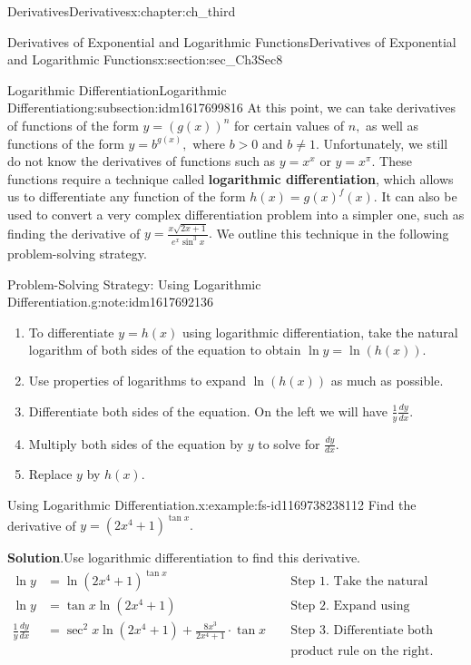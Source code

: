 \documentclass[oneside,10pt,]{book}
\newcommand{\blocktitlefont}{\relax}
\newcommand{\terminology}[1]{\textbf{#1}}
\numberwithin{equation}{section}
\newcommand{\gt}{>}
\newcommand{\amp}{&}
\begin{document}
\begin{chapterptx}{Derivatives}{}{Derivatives}{}{}{x:chapter:ch_third}
\begin{sectionptx}{Derivatives of Exponential and Logarithmic Functions}{}{Derivatives of Exponential and Logarithmic Functions}{}{}{x:section:sec_Ch3Sec8}
\begin{subsectionptx}{Logarithmic Differentiation}{}{Logarithmic Differentiation}{}{}{g:subsection:idm1617699816}
At this point, we can take derivatives of functions of the form \(y=(g(x))^n\) for certain values of \(n,\) as well as functions of the form \(y=b^{g(x)},\) where \(b\gt 0\) and \(b\neq 1.\) Unfortunately, we still do not know the derivatives of functions such as \(y=x^x\) or \(y=x^\pi.\) These functions require a technique called \terminology{logarithmic differentiation}, which allows us to differentiate any function of the form \(h(x)=g(x)^f(x).\) It can also be used to convert a very complex differentiation problem into a simpler one, such as finding the derivative of \(y=\frac{x\sqrt{2x+1}}{e^x\sin^3x}.\) We outline this technique in the following problem-solving strategy.%
\begin{note}{Problem-Solving Strategy: Using Logarithmic Differentiation.}{g:note:idm1617692136}%
%
\begin{enumerate}
\item{}To differentiate \(y=h(x)\) using logarithmic differentiation, take the natural logarithm of both sides of the equation to obtain \(\ln  y=\ln  (h(x)).\)%
\item{}Use properties of logarithms to expand \(\ln  (h(x))\) as much as possible.%
\item{}Differentiate both sides of the equation. On the left we will have \(\frac{1}{y} \frac{dy}{dx}.\)%
\item{}Multiply both sides of the equation by \(y\) to solve for \(\frac{dy}{dx}.\)%
\item{}Replace \(y\) by \(h(x).\)%
\end{enumerate}
\end{note}
\begin{example}{Using Logarithmic Differentiation.}{x:example:fs-id1169738238112}%
Find the derivative of \(y=(2x^4+1)^{\tan  x}.\)%
\par\smallskip%
\noindent\textbf{\blocktitlefont Solution}.\hypertarget{g:solution:idm1617688552}{}\quad{}Use logarithmic differentiation to find this derivative.%
%
\begin{align*}
\ln  y\amp=\ln (2x^4+1)^{\tan  x}\amp\amp\text{ Step 1. Take the natural logarithm of both sides. }\\
\ln  y\amp=\tan  x \ln  (2x^4+1)\amp\amp\text{ Step 2. Expand using properties of logarithms. }\\
\frac{1}{y} \frac{dy}{dx}\amp=\sec^2x \ln  (2x^4+1)+\frac{8x^3}{2x^4+1}\cdot \tan  x\amp \amp \text{ Step 3. Differentiate both sides. Use the }\\
\amp \amp \amp \text{ product rule on the right. }\\

\end{align*}
\end{example}
\end{subsectionptx}
\end{sectionptx}
\end{chapterptx}
\end{document}
